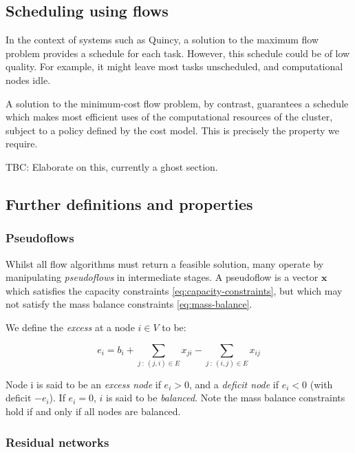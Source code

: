 \subsection{Scheduling using flows}

In the context of systems such as Quincy, a solution to the maximum
flow problem provides a schedule for each task. However, this schedule
could be of low quality. For example, it might leave most tasks unscheduled,
and computational nodes idle.

A solution to the minimum-cost flow problem, by contrast, guarantees
a schedule which makes most efficient uses of the computational resources
of the cluster, subject to a policy defined by the cost model. This
is precisely the property we require.

TBC: Elaborate on this, currently a ghost section.

\subsection{Further definitions and properties}

\subsubsection{Pseudoflows} \label{sec:prep-flow-pseudo}

Whilst all flow algorithms must return a feasible solution, many operate
by manipulating \emph{pseudoflows} in intermediate stages. A pseudoflow
is a vector $\mathbf{x}$ which satisfies the capacity constraints
\cref{eq:capacity-constraints}, but which may not satisfy the mass balance constraints \cref{eq:mass-balance}.

We define the \emph{excess} at a node $i\in V$ to be:

\begin{equation}
e_{i}=b_{i}+\sum_{j\::\:(j,i)\in E}x_{ji}-\sum_{j\::\:(i,j)\in E}x_{ij}
\end{equation}

Node i is said to be an \emph{excess node} if $e_{i}>0$, and a \emph{deficit
	node} if $e_{i}<0$ (with deficit $-e_{i}$). If $e_{i}=0$, $i$
is said to be \emph{balanced}. Note the mass balance constraints hold if and
only if all nodes are balanced.

\subsubsection{Residual networks}

